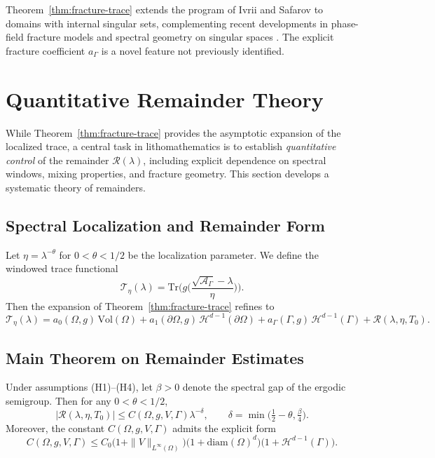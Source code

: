 \begin{remark}
Theorem~\ref{thm:fracture-trace} extends the program of Ivrii and Safarov to
domains with internal singular sets, complementing recent developments in
phase-field fracture models \cite{BourdinFrancfortMarigo2008} and spectral
geometry on singular spaces \cite{Cheeger1983,BruningSeeley1987}. The explicit
fracture coefficient $a_\Gamma$ is a novel feature not previously identified.
\end{remark}

\section{Quantitative Remainder Theory}
\label{sec:remainder-theory}

While Theorem~\ref{thm:fracture-trace} provides the asymptotic expansion of
the localized trace, a central task in lithomathematics is to establish
\emph{quantitative control} of the remainder $\mathcal{R}(\lambda)$, including
explicit dependence on spectral windows, mixing properties, and fracture
geometry. This section develops a systematic theory of remainders.

\subsection{Spectral Localization and Remainder Form}
Let $\eta = \lambda^{-\theta}$ for $0<\theta<1/2$ be the localization
parameter. We define the windowed trace functional
\[
\mathcal{T}_\eta(\lambda) = \mathrm{Tr}\Big( g\!\Big(\frac{\sqrt{\mathcal{A}_\Gamma}-\lambda}{\eta}\Big)\Big).
\]
Then the expansion of Theorem~\ref{thm:fracture-trace} refines to
\[
\mathcal{T}_\eta(\lambda)
= a_0(\Omega,g)\,\mathrm{Vol}(\Omega)
 + a_1(\partial\Omega,g)\,\mathcal{H}^{d-1}(\partial\Omega)
 + a_\Gamma(\Gamma,g)\,\mathcal{H}^{d-1}(\Gamma)
 + \mathcal{R}(\lambda,\eta,T_0).
\]

\subsection{Main Theorem on Remainder Estimates}
\begin{theorem}
\label{thm:quantitative-remainder}
Under assumptions (H1)--(H4), let $\beta>0$ denote the spectral gap of the
ergodic semigroup. Then for any $0<\theta<1/2$,
\[
|\mathcal{R}(\lambda,\eta,T_0)| \leq
C(\Omega,g,V,\Gamma) \lambda^{-\delta},
\qquad \delta = \min\!\Big(\tfrac{1}{2}-\theta,\tfrac{\beta}{4}\Big).
\]
Moreover, the constant $C(\Omega,g,V,\Gamma)$ admits the explicit form
\[
C(\Omega,g,V,\Gamma) \leq C_0
\Big( 1 + \|\!V\!\|_{L^\infty(\Omega)} \Big)
\Big( 1 + \mathrm{diam}(\Omega)^d \Big)
\Big( 1 + \mathcal{H}^{d-1}(\Gamma) \Big).
\]
\end{theorem}

